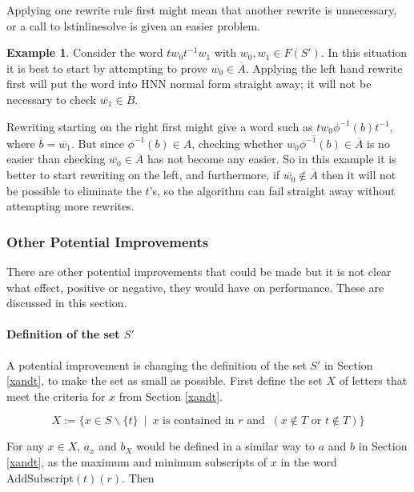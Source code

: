 \documentclass[12pt]{article} %
\theoremstyle{definition}
\theoremstyle{definition}
\theoremstyle{definition}
\theoremstyle{definition}
\newtheorem{exmpl}[thm]{Example}
\begin{document}
Applying one rewrite rule first
might mean that another rewrite is unnecessary, or a call to lstinline{solve} is
given an easier problem.

\begin{exmpl}\label{rtlbad}
Consider the word $tw_0t^{-1}w_1$ with $w_0, w_1 \in F(S')$. In this situation
it is best to start by attempting to prove $\overline{w_0} \in \overline{A}$.
Applying the left hand rewrite first will put the word into HNN normal form
straight away; it will not be necessary to check $\overline{w_1} \in \overline{B}$.

Rewriting starting on the right first might give a word such as
$tw_0 \phi^{-1}(b)t^{-1}$, where $\overline{b} = \overline{w_1}$. But since
$\phi^{-1}(b) \in A$, checking whether $\overline{w_0\phi^{-1}(b)} \in \overline{A}$ is
no easier than checking $\overline{w_0} \in \overline{A}$ has not become
any easier. So in this example it is better to start rewriting on the left, and furthermore,
if $\overline{w_0} \notin \overline{A}$ then it will not be possible to eliminate the $t$'s, so the
algorithm can fail straight away without attempting more rewrites.

\subsubsection{Other Potential Improvements}

There are other potential improvements that could be made but it is not clear
what effect, positive or negative, they would have on performance. These are discussed
in this section.

\paragraph{Definition of the set $S'$}

A potential improvement is changing the definition of the set $S'$ in Section \ref{xandt},
to make the set as small as possible.
First define the set $X$
of letters that meet the criteria for $x$ from Section \ref{xandt}.

\begin{equation}
  X := \{ x \in S \backslash \{t\} \ \mid \
    x \text{ is contained in }r \text{ and } \ (x \notin T \text{ or } t \notin T) \}
\end{equation}

For any $x \in X$, $a_x$ and $b_X$ would be defined in a similar way to $a$ and
$b$ in Section \ref{xandt}, as the maximum and minimum subscripts of $x$ in the word
$\text{AddSubscript}(t)(r)$. Then


\end{exmpl}
\end{document}
